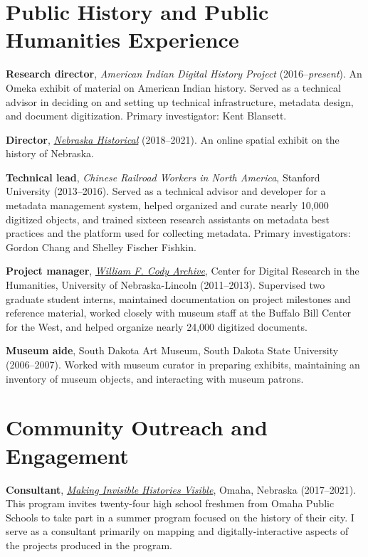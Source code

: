 \hypertarget{public-history-and-public-humanities-experience}{%
\section{Public History and Public Humanities
Experience}\label{public-history-and-public-humanities-experience}}

\textbf{Research director}, \emph{American Indian Digital History
Project} (2016--\emph{present}). An Omeka exhibit of material on
American Indian history. Served as a technical advisor in deciding on
and setting up technical infrastructure, metadata design, and document
digitization. Primary investigator: Kent Blansett.

\textbf{Director}, \emph{\href{https://omahahistorical.org}{Nebraska
Historical}} (2018--2021). An online spatial exhibit on the history of
Nebraska.

\textbf{Technical lead}, \emph{Chinese Railroad Workers in North
America}, Stanford University (2013--2016). Served as a technical
advisor and developer for a metadata management system, helped organized
and curate nearly 10,000 digitized objects, and trained sixteen research
assistants on metadata best practices and the platform used for
collecting metadata. Primary investigators: Gordon Chang and Shelley
Fischer Fishkin.

\textbf{Project manager}, \emph{\href{http://codyarchive.org}{William F.
Cody Archive}}, Center for Digital Research in the Humanities,
University of Nebraska-Lincoln (2011--2013). Supervised two graduate
student interns, maintained documentation on project milestones and
reference material, worked closely with museum staff at the Buffalo Bill
Center for the West, and helped organize nearly 24,000 digitized
documents.

\textbf{Museum aide}, South Dakota Art Museum, South Dakota State
University (2006--2007). Worked with museum curator in preparing
exhibits, maintaining an inventory of museum objects, and interacting
with museum patrons.

\hypertarget{community-outreach-and-engagement}{%
\section{Community Outreach and
Engagement}\label{community-outreach-and-engagement}}

\textbf{Consultant}, \emph{\href{http://invisiblehistory.ops.org}{Making
Invisible Histories Visible}}, Omaha, Nebraska (2017--2021). This
program invites twenty-four high school freshmen from Omaha Public
Schools to take part in a summer program focused on the history of their
city. I serve as a consultant primarily on mapping and
digitally-interactive aspects of the projects produced in the program.

